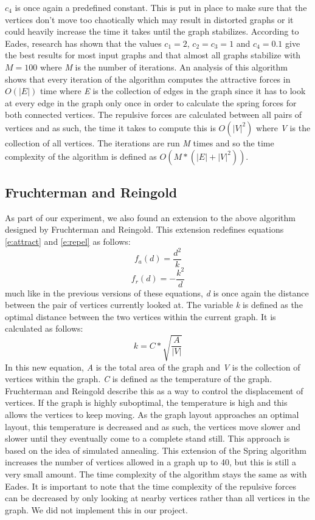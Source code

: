 \documentclass[a4paper,12pt,twoside]{article}
\begin{document}
$c_4$ is once again a predefined constant. This is put in place to make sure that the vertices don't move too chaotically which may result in distorted graphs or it could heavily increase the time it takes until the graph stabilizes.
\newline
According to Eades, research has shown that the values $c_1=2$, $c_2=c_3=1$ and $c_4=0.1$ give the best results for most input graphs and that almost all graphs stabilize with $M=100$ where \emph{M} is the number of iterations.
\newline
An analysis of this algorithm shows that every iteration of the algorithm computes the attractive forces in $O(|E|)$ time where \emph{E} is the collection of edges in the graph since it has to look at every edge in the graph only once in order to calculate the spring forces for both connected vertices. The repulsive forces are calculated between all pairs of vertices and as such, the time it takes to compute this is $O(|V|^2)$ where \emph{V} is the collection of all vertices. The iterations are run \emph{M} times and so the time complexity of the algorithm is defined as $O(M*(|E| + |V|^2))$.
\subsection{Fruchterman and Reingold}
As part of our experiment, we also found an extension to the above algorithm designed by Fruchterman and Reingold\cite{FandR}. This extension redefines equations \ref{e:attract} and \ref{e:repel} as follows:
\begin{equation}\label{e:FRattract}
f_a(d)=\frac{d^2}{k}
\end{equation}
\begin{equation}\label{e:FRrepel}
f_r(d)=-\frac{k^2}{d}
\end{equation}
much like in the previous versions of these equations, \emph{d} is once again the distance between the pair of vertices currently looked at. The variable \emph{k} is defined as the optimal distance between the two vertices within the current graph. It is calculated as follows:
\begin{equation}\label{e:optimalD}
k=C*\sqrt{\frac{A}{|V|}}
\end{equation}
In this new equation, \emph{A} is the total area of the graph and \emph{V} is the collection of vertices within the graph. \emph{C} is defined as the temperature of the graph. Fruchterman and Reingold describe this as a way to control the displacement of vertices. If the graph is highly suboptimal, the temperature is high and this allows the vertices to keep moving. As the graph layout approaches an optimal layout, this temperature is decreased and as such, the vertices move slower and slower until they eventually come to a complete stand still. This approach is based on the idea of simulated annealing.
\newline
This extension of the Spring algorithm increases the number of vertices allowed in a graph up to 40, but this is still a very small amount. The time complexity of the algorithm stays the same as with Eades. It is important to note that the time complexity of the repulsive forces can be decreased by only looking at nearby vertices rather than all vertices in the graph. We did not implement this in our project.
\end{document}
